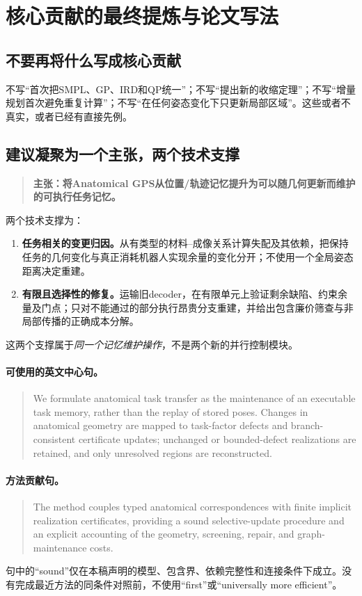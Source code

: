\documentclass[UTF8,11pt,a4paper,fontset=fandol]{ctexart}
\numberwithin{equation}{section}
\theoremstyle{definition}
\begin{document}
\section{核心贡献的最终提炼与论文写法}
\subsection{不要再将什么写成核心贡献}
不写“首次把SMPL、GP、IRD和QP统一”；不写“提出新的收缩定理”；不写“增量规划首次避免重复计算”；不写“在任何姿态变化下只更新局部区域”。这些或者不真实，或者已经有直接先例。

\subsection{建议凝聚为一个主张，两个技术支撑}
\begin{quote}
\textbf{主张：将Anatomical GPS从位置/轨迹记忆提升为可以随几何更新而维护的可执行任务记忆。}
\end{quote}
两个技术支撑为：
\begin{enumerate}
\item \textbf{任务相关的变更归因。}从有类型的材料--成像关系计算失配及其依赖，把保持任务的几何变化与真正消耗机器人实现余量的变化分开；不使用一个全局姿态距离决定重建。
\item \textbf{有限且选择性的修复。}运输旧decoder，在有限单元上验证剩余缺陷、约束余量及门点；只对不能通过的部分执行昂贵分支重建，并给出包含廉价筛查与非局部传播的正确成本分解。
\end{enumerate}
这两个支撑属于\emph{同一个记忆维护操作}，不是两个新的并行控制模块。

\paragraph{可使用的英文中心句。}
\begin{quote}
We formulate anatomical task transfer as the maintenance of an executable task memory, rather than the replay of stored poses. Changes in anatomical geometry are mapped to task-factor defects and branch-consistent certificate updates; unchanged or bounded-defect realizations are retained, and only unresolved regions are reconstructed.
\end{quote}

\paragraph{方法贡献句。}
\begin{quote}
The method couples typed anatomical correspondences with finite implicit realization certificates, providing a sound selective-update procedure and an explicit accounting of the geometry, screening, repair, and graph-maintenance costs.
\end{quote}
句中的``sound''仅在本稿声明的模型、包含界、依赖完整性和连接条件下成立。没有完成最近方法的同条件对照前，不使用``first''或``universally more efficient''。
\end{document}
